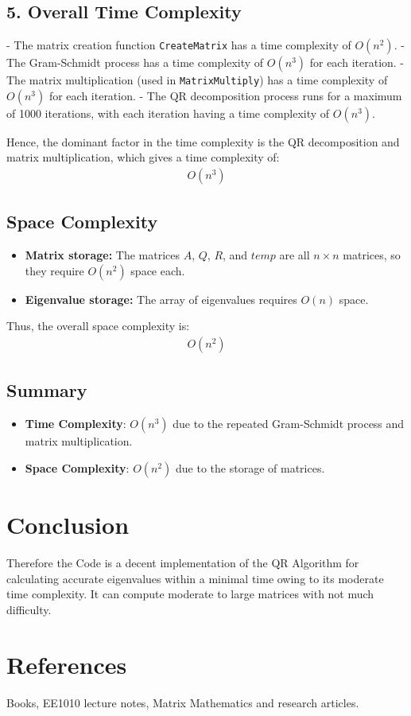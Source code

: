 \documentclass[article]{IEEEtran}
\numberwithin{equation}{enumi}
\numberwithin{figure}{enumi}
\begin{document}
\subsection*{5. Overall Time Complexity}
- The matrix creation function \texttt{CreateMatrix} has a time complexity of $O(n^2)$.
- The Gram-Schmidt process has a time complexity of $O(n^3)$ for each iteration.
- The matrix multiplication (used in \texttt{MatrixMultiply}) has a time complexity of $O(n^3)$ for each iteration.
- The QR decomposition process runs for a maximum of 1000 iterations, with each iteration having a time complexity of $O(n^3)$.

Hence, the dominant factor in the time complexity is the QR decomposition and matrix multiplication, which gives a time complexity of:
\begin{align*}
O(n^3)
\end{align*}

\subsection*{Space Complexity}
\begin{itemize}
\item \textbf{Matrix storage:} The matrices $A$, $Q$, $R$, and $temp$ are all $n \times n$ matrices, so they require $O(n^2)$ space each.
\item \textbf{Eigenvalue storage:} The array of eigenvalues requires $O(n)$ space.
\end{itemize}

Thus, the overall space complexity is:
\begin{align*}
O(n^2)
\end{align*}

\subsection*{Summary}
\begin{itemize}
\item \textbf{Time Complexity}: $O(n^3)$ due to the repeated Gram-Schmidt process and matrix multiplication.
\item \textbf{Space Complexity}: $O(n^2)$ due to the storage of matrices.
\end{itemize}

\section{Conclusion}
Therefore the Code is a decent implementation of the QR Algorithm for calculating accurate eigenvalues within a minimal time owing to its moderate time complexity. It can compute moderate to large matrices with not much difficulty.

\section{References}
	Books, EE1010 lecture notes, Matrix Mathematics and research articles.
\end{document}
